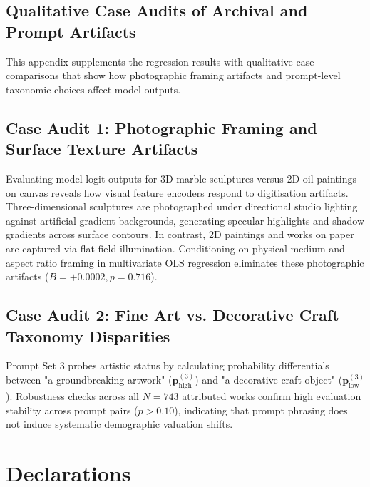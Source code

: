\documentclass[pdflatex,sn-mathphys-num]{sn-jnl}%
\theoremstyle{thmstyleone}%
\theoremstyle{thmstyletwo}%
\theoremstyle{thmstylethree}%
\begin{document}
\begin{appendices}
\section{Qualitative Case Audits of Archival and Prompt Artifacts}
\label{sec:appendix_cases}

This appendix supplements the regression results with qualitative case comparisons that show how photographic framing artifacts and prompt-level taxonomic choices affect model outputs.

\subsection{Case Audit 1: Photographic Framing and Surface Texture Artifacts}
Evaluating model logit outputs for 3D marble sculptures versus 2D oil paintings on canvas reveals how visual feature encoders respond to digitisation artifacts. Three-dimensional sculptures are photographed under directional studio lighting against artificial gradient backgrounds, generating specular highlights and shadow gradients across surface contours. In contrast, 2D paintings and works on paper are captured via flat-field illumination. Conditioning on physical medium and aspect ratio framing in multivariate OLS regression eliminates these photographic artifacts ($B = +0.0002, p = 0.716$).

\subsection{Case Audit 2: Fine Art vs. Decorative Craft Taxonomy Disparities}
Prompt Set 3 probes artistic status by calculating probability differentials between "a groundbreaking artwork" ($\mathbf{p}_{\text{high}}^{(3)}$) and "a decorative craft object" ($\mathbf{p}_{\text{low}}^{(3)}$). Robustness checks across all $N=743$ attributed works confirm high evaluation stability across prompt pairs ($p > 0.10$), indicating that prompt phrasing does not induce systematic demographic valuation shifts.
\end{appendices}


\section*{Declarations}
\end{document}
